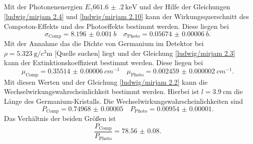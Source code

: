 Mit der Photonenenergien $E_{\gamma}\SI{661.6(2)}{\kilo\eV}$ und der Hilfe der Gleichungen \eqref{ludwig/mirjam 2.4} und 
\eqref{ludwig/mirjam 2.10} kann der Wirkungsquerschnitt des Compoton-Effekts und des Photoeffekts bestimmt werden.
Diese liegen bei 
\begin{equation*}
  \sigma_{\text{Comp}}=\SI{8.196(1)}{b} \quad \sigma_{\text{Photo}}=\SI{0.05674(6)}{b}.
\end{equation*} 
Mit der Annahme das die Dichte von Germanium im Detektor bei $\rho = \SI{5.323}{\gram\per\cubic\centi\meter}$ [Quelle suchen] liegt und der
Gleichung \eqref{ludwig/mirjam 2.3} kann der Extinktionskoeffizient bestimmt werden.
Diese liegen bei 
\begin{equation*}
  \mu_{\text{Comp}} = \SI{0.35514(6)}{cm^{-1}} \quad \mu_{\text{Photo}} = \SI{0.002459(2)}{cm^{-1}}.
\end{equation*}
Mit diesen Werten und der Gleichung \eqref{ludwig/mirjam 2.2} kann die Wechselwirkungswahrscheinlichkeit bestimmt werden.
Hierbei ist $l=\SI{3.9}{\centi\meter}$ die Länge des Germanium-Kristalls.
Die Wechselwirkungswahrscheinlichkeiten sind 
\begin{equation*}
  P_{\text{Comp}} = \num{0.74968(5)}\quad P_{\text{Photo}} = \num{0.00954(1)}.
\end{equation*}
Das Verhältnis der beiden Größen ist
\begin{equation*}
  \frac{P_{\text{Comp}} }{P_{\text{Photo}}} = \num{78.56(8)}.
\end{equation*}

